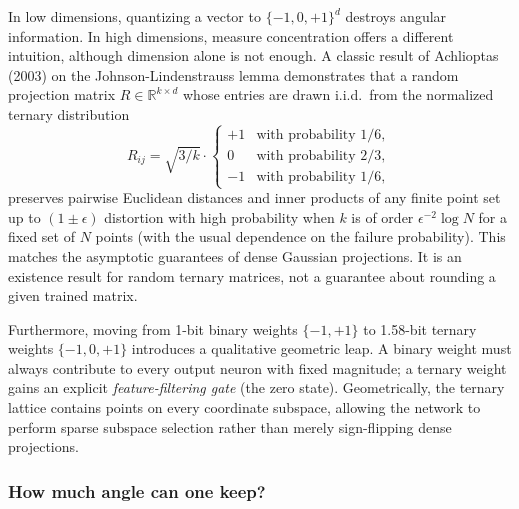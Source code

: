 In low dimensions, quantizing a vector to $\{-1, 0, +1\}^d$ destroys angular information. In high dimensions, measure concentration offers a different intuition, although dimension alone is not enough. A classic result of Achlioptas (2003) on the Johnson-Lindenstrauss lemma demonstrates that a random projection matrix $R \in \mathbb{R}^{k \times d}$ whose entries are drawn i.i.d.\ from the normalized ternary distribution
\[
    R_{ij} = \sqrt{3/k} \cdot \begin{cases}
        +1 & \text{with probability } 1/6, \\
        0  & \text{with probability } 2/3, \\
        -1 & \text{with probability } 1/6,
    \end{cases}
\]
preserves pairwise Euclidean distances and inner products of any finite point set up to $(1 \pm \epsilon)$ distortion with high probability when $k$ is of order $\epsilon^{-2}\log N$ for a fixed set of $N$ points (with the usual dependence on the failure probability). This matches the asymptotic guarantees of dense Gaussian projections. It is an existence result for random ternary matrices, not a guarantee about rounding a given trained matrix.

Furthermore, moving from 1-bit binary weights $\{-1, +1\}$ to 1.58-bit ternary weights $\{-1, 0, +1\}$ introduces a qualitative geometric leap. A binary weight must always contribute to every output neuron with fixed magnitude; a ternary weight gains an explicit \emph{feature-filtering gate} (the zero state). Geometrically, the ternary lattice contains points on every coordinate subspace, allowing the network to perform sparse subspace selection rather than merely sign-flipping dense projections.

\subsubsection{How much angle can one keep?}

